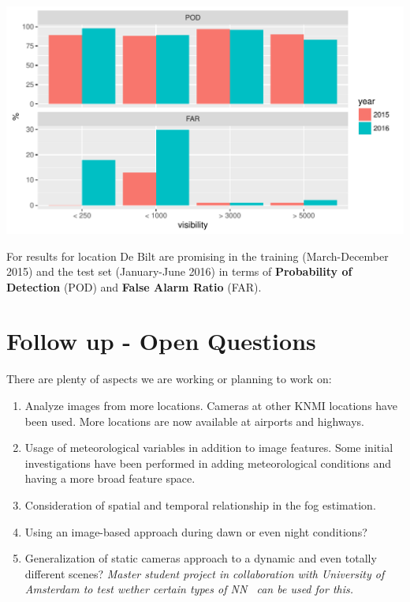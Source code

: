 \documentclass{article}
\begin{document}
\begin{minipage}[b]{\columnwidth}
	\begin{center}
	\includegraphics[width=0.9\columnwidth]{PODandFAR3-1}
	\label{PODFAR}
	\end{center}
\end{minipage}
For results for location De Bilt are promising in the training 
(March-December 2015) and the test set (January-June 2016) in terms of 
\textbf{Probability of Detection} (POD) and \textbf{False Alarm Ratio} (FAR).



\section*{Follow up - Open Questions}
There are plenty of aspects we are working or planning to work on:
\begin{enumerate}
\item Analyze images from more locations. \newline
Cameras at other KNMI locations have been used. More locations are now available at airports and highways.
\item Usage of meteorological variables in addition to image features.\newline
Some initial investigations have been performed in adding meteorological conditions and having a more broad feature space.
\item Consideration of spatial and temporal relationship in the fog estimation.
\item Using an image-based approach during dawn or even night conditions? 
\item Generalization of static cameras approach to a dynamic and even totally different scenes? \emph{Master student project in collaboration with University of Amsterdam to test wether certain types of NN~\cite{ganin2016domain} can be used for this.}
\end{enumerate}
\end{document}
